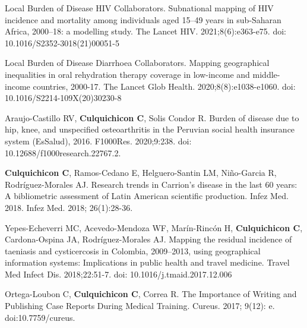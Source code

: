 \documentclass[10pt]{article}
\begin{document}
\begin{etaremune}
\vspace{-0.15in}
	
	\item Local Burden of Disease HIV Collaborators. Subnational mapping of HIV incidence and mortality among individuals aged 15–49 years in sub-Saharan Africa, 2000–18: a modelling study. The Lancet HIV. 2021;8(6):e363-e75. doi: 10.1016/S2352-3018(21)00051-5 \\
	\vspace{-0.23in}
	
	\item Local Burden of Disease Diarrhoea Collaborators. Mapping geographical inequalities in oral rehydration therapy coverage in low-income and middle-income countries, 2000-17. The Lancet Glob Health. 2020;8(8):e1038-e1060. doi: 10.1016/S2214-109X(20)30230-8 \\
	\vspace{-0.23in}
	
	\item Araujo-Castillo RV, {\bf Culquichicon C}, Solis Condor R. Burden of disease due to hip, knee, and unspecified osteoarthritis in the Peruvian social health insurance system (EsSalud), 2016. F1000Res. 2020;9:238. doi: 10.12688/f1000research.22767.2. \\
	\vspace{-0.23in}
	
	\item {\bf Culquichicon C}, Ramos-Cedano E, Helguero-Santin LM, Niño-Garcia R, Rodríguez-Morales AJ. Research trends in Carrion’s disease in the last 60 years: A bibliometric assessment of Latin American scientific production. Infez Med. 2018. Infez Med. 2018; 26(1):28-36. \\
	\vspace{-0.23in}
	
	\item Yepes-Echeverri MC, Acevedo-Mendoza WF, Marín-Rincón H, {\bf Culquichicon C}, Cardona-Ospina JA, Rodríguez-Morales AJ. Mapping the residual incidence of taeniasis and cysticercosis in Colombia, 2009–2013, using geographical information systems: Implications in public health and travel medicine. Travel Med Infect Dis. 2018;22:51-7. doi: 10.1016/j.tmaid.2017.12.006 \\
	\vspace{-0.23in}

	\item Ortega-Loubon C, {\bf Culquichicon C}, Correa R. The Importance of Writing and Publishing Case Reports During Medical Training. Cureus. 2017; 9(12): e. doi:10.7759/cureus. \\
	\vspace{-0.23in}


\end{etaremune}
\end{document}

